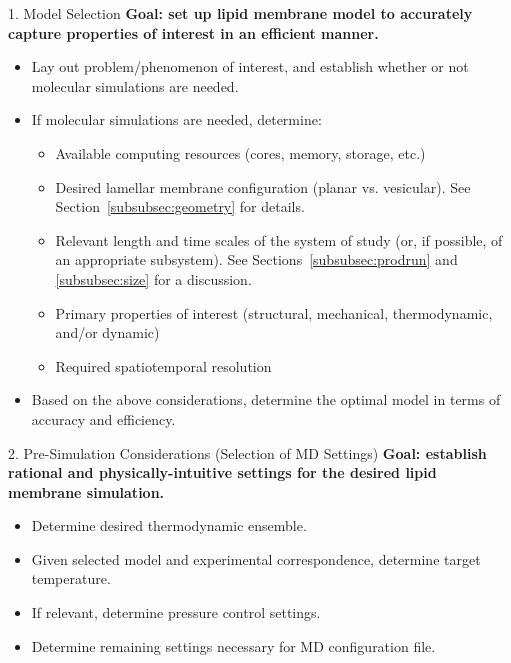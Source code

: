 \documentclass[9pt,bestpractices]{livecoms}
\begin{document}
\begin{Checklists*}[p!]

\begin{checklist}{1. Model Selection}
\textbf{Goal: set up lipid membrane model to accurately capture properties of interest in an efficient manner.}
\begin{itemize}
\item Lay out problem/phenomenon of interest, and establish whether or not molecular simulations are needed.
\item If molecular simulations are needed, determine:
	\begin{itemize}
	\item Available computing resources (cores, memory, storage, etc.)
	\item Desired lamellar membrane configuration (planar vs. vesicular). See Section~\ref{subsubsec:geometry} for details.
	\item Relevant length and time scales of the system of study (or, if possible, of an appropriate subsystem). See Sections~\ref{subsubsec:prodrun} and \ref{subsubsec:size} for a discussion.
	\item Primary properties of interest (structural, mechanical, thermodynamic, and/or dynamic)
	\item Required spatiotemporal resolution
	\end{itemize}
\item Based on the above considerations, determine the optimal model in terms of accuracy and efficiency.
\end{itemize}
\end{checklist}

\begin{checklist}{2. Pre-Simulation Considerations (Selection of MD Settings)}
\textbf{Goal: establish rational and physically-intuitive settings for the desired lipid membrane simulation.}
\begin{itemize}
\item Determine desired thermodynamic ensemble.
\item Given selected model and experimental correspondence, determine target temperature.
\item If relevant, determine pressure control settings.
\item Determine remaining settings necessary for MD configuration file.
\end{itemize}
\end{checklist}


\end{Checklists*}
\end{document}
